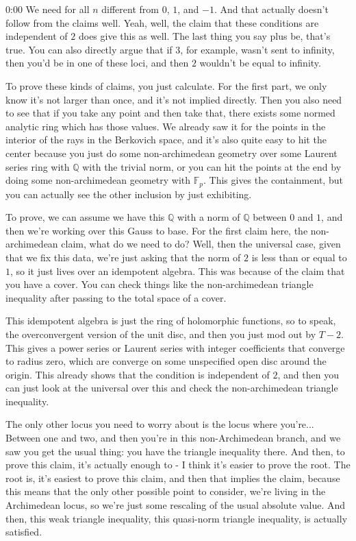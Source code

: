 \begin{unfinished}{0:00}
We need for all $n$ different from $0$, $1$, and $-1$. And that actually doesn't follow from the claims well. Yeah, well, the claim that these conditions are independent of $2$ does give this as well. The last thing you say plus be, that's true. You can also directly argue that if $3$, for example, wasn't sent to infinity, then you'd be in one of these loci, and then $2$ wouldn't be equal to infinity.

To prove these kinds of claims, you just calculate. For the first part, we only know it's not larger than once, and it's not implied directly. Then you also need to see that if you take any point and then take that, there exists some normed analytic ring which has those values. We already saw it for the points in the interior of the rays in the Berkovich space, and it's also quite easy to hit the center because you just do some non-archimedean geometry over some Laurent series ring with $\mathbb{Q}$ with the trivial norm, or you can hit the points at the end by doing some non-archimedean geometry with $\mathbb{F}_p$. This gives the containment, but you can actually see the other inclusion by just exhibiting.

To prove, we can assume we have this $\mathbb{Q}$ with a norm of $\mathbb{Q}$ between $0$ and $1$, and then we're working over this Gauss to base. For the first claim here, the non-archimedean claim, what do we need to do? Well, then the universal case, given that we fix this data, we're just asking that the norm of $2$ is less than or equal to $1$, so it just lives over an idempotent algebra. This was because of the claim that you have a cover. You can check things like the non-archimedean triangle inequality after passing to the total space of a cover.

This idempotent algebra is just the ring of holomorphic functions, so to speak, the overconvergent version of the unit disc, and then you just mod out by $T - 2$. This gives a power series or Laurent series with integer coefficients that converge to radius zero, which are converge on some unspecified open disc around the origin. This already shows that the condition is independent of $2$, and then you can just look at the universal over this and check the non-archimedean triangle inequality.

The only other locus you need to worry about is the locus where you're...
Between one and two, and then you're in this non-Archimedean branch, and we saw you get the usual thing: you have the triangle inequality there. And then, to prove this claim, it's actually enough to - I think it's easier to prove the root. The root is, it's easiest to prove this claim, and then that implies the claim, because this means that the only other possible point to consider, we're living in the Archimedean locus, so we're just some rescaling of the usual absolute value. And then, this weak triangle inequality, this quasi-norm triangle inequality, is actually satisfied.


\end{unfinished}
